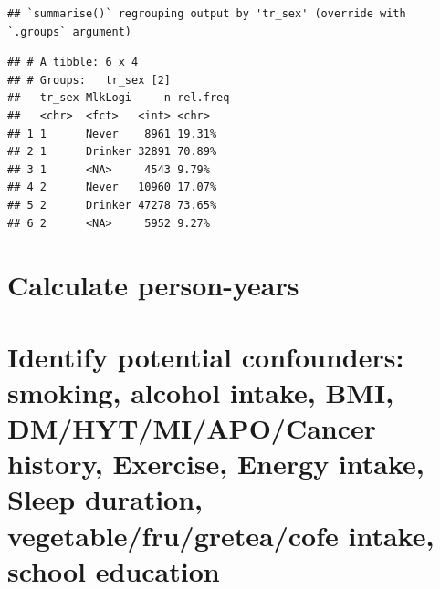 \documentclass[
]{article}
\newenvironment{Shaded}{\begin{snugshade}}{\end{snugshade}}
\newcommand{\DataTypeTok}[1]{\textcolor[rgb]{0.13,0.29,0.53}{#1}}
\newcommand{\DecValTok}[1]{\textcolor[rgb]{0.00,0.00,0.81}{#1}}
\newcommand{\FloatTok}[1]{\textcolor[rgb]{0.00,0.00,0.81}{#1}}
\newcommand{\KeywordTok}[1]{\textcolor[rgb]{0.13,0.29,0.53}{\textbf{#1}}}
\newcommand{\NormalTok}[1]{#1}
\newcommand{\OperatorTok}[1]{\textcolor[rgb]{0.81,0.36,0.00}{\textbf{#1}}}
\newcommand{\OtherTok}[1]{\textcolor[rgb]{0.56,0.35,0.01}{#1}}
\newcommand{\StringTok}[1]{\textcolor[rgb]{0.31,0.60,0.02}{#1}}
\begin{document}
\begin{verbatim}
## `summarise()` regrouping output by 'tr_sex' (override with `.groups` argument)
\end{verbatim}

\begin{verbatim}
## # A tibble: 6 x 4
## # Groups:   tr_sex [2]
##   tr_sex MlkLogi     n rel.freq
##   <chr>  <fct>   <int> <chr>   
## 1 1      Never    8961 19.31%  
## 2 1      Drinker 32891 70.89%  
## 3 1      <NA>     4543 9.79%   
## 4 2      Never   10960 17.07%  
## 5 2      Drinker 47278 73.65%  
## 6 2      <NA>     5952 9.27%
\end{verbatim}

\hypertarget{calculate-person-years}{%
\section{Calculate person-years}\label{calculate-person-years}}

\begin{Shaded}
\end{Shaded}

\hypertarget{identify-potential-confounders-smoking-alcohol-intake-bmi-dmhytmiapocancer-history-exercise-energy-intake-sleep-duration-vegetablefrugreteacofe-intake-school-education}{%
\section{Identify potential confounders: smoking, alcohol intake, BMI,
DM/HYT/MI/APO/Cancer history, Exercise, Energy intake, Sleep duration,
vegetable/fru/gretea/cofe intake, school
education}\label{identify-potential-confounders-smoking-alcohol-intake-bmi-dmhytmiapocancer-history-exercise-energy-intake-sleep-duration-vegetablefrugreteacofe-intake-school-education}}
\end{document}

